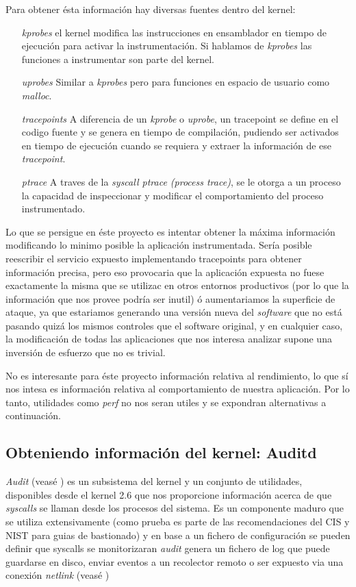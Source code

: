 Para obtener ésta información hay diversas fuentes dentro del kernel:

\begin{enumerate}
    \item[\emph{kprobes}] el kernel modifica las instrucciones en ensamblador en tiempo de ejecución para activar la instrumentación. Si hablamos
    de \emph{kprobes} las funciones a instrumentar son parte del kernel. 
    \item[\emph{uprobes}] Similar a \emph{kprobes} pero para funciones en espacio de usuario como \emph{malloc}.
    \item[\emph{tracepoints}] A diferencia de un \emph{kprobe} o \emph{uprobe}, un tracepoint se define en el codigo fuente y se genera en tiempo de compilación, pudiendo ser activados en tiempo de ejecución cuando se requiera y extraer la información de ese \emph{tracepoint}.
    \item[\emph{ptrace}] A traves de la \emph{syscall ptrace (process trace)}, se le otorga a un proceso la capacidad de inspeccionar y modificar el comportamiento del proceso instrumentado. 
\end{enumerate}

Lo que se persigue en éste proyecto es intentar obtener la máxima información modificando lo minimo posible la aplicación instrumentada. Sería posible
reescribir el servicio expuesto implementando tracepoints para obtener información precisa, pero eso provocaria que la aplicación expuesta no fuese exactamente la misma que se utilizac
en otros entornos productivos (por lo que la información que nos provee podría ser inutil) ó aumentariamos la superficie de ataque, ya que estariamos
generando una versión nueva del \emph{software} que no está pasando quizá los mismos controles que el software original, y en cualquier caso, la modificación de todas las aplicaciones
que nos interesa analizar supone una inversión de esfuerzo que no es trivial.

No es interesante para éste proyecto información relativa al rendimiento, lo que sí nos intesa es información relativa al comportamiento de nuestra aplicación. Por lo tanto,
utilidades como \emph{perf} no nos seran utiles y se expondran alternativas a continuación.

\subsection{Obteniendo información del kernel: Auditd}

\emph{Audit} (veasé \cite{redhat-auditd}) es un subsistema del kernel y un conjunto de utilidades, 
disponibles desde el kernel 2.6 que nos proporcione información acerca de que \emph{syscalls}
se llaman desde los procesos del sistema. 
Es un componente maduro que se utiliza extensivamente (como prueba es parte de las recomendaciones del CIS y NIST para guias de bastionado)
y en base a un fichero de configuración se pueden definir que syscalls se monitorizaran
\emph{audit} genera un fichero de log que puede guardarse en disco, enviar eventos a un recolector remoto o ser expuesto via una conexión
\emph{netlink} (veasé \cite{wiki-netlink})

